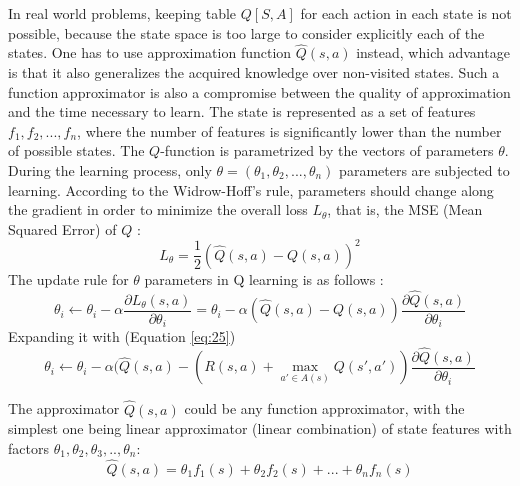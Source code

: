             
            In real world problems, keeping table $Q[S, A]$ for each action in each state is not possible,
            because the state space is too large to consider explicitly each of the states. One has to use
            approximation function  $\hat{Q}(s,a)$ instead, which advantage is that it also generalizes the acquired
            knowledge over non-visited states. Such a function approximator is also a compromise between
            the quality of approximation and the time necessary to learn.
            The state is represented as a set of features $f_1 , f_2 , ..., f_n$,  where the number of features is
            significantly lower than the number of possible states. The $Q$-function is parametrized by the
            vectors of parameters $\theta$. During the learning process, only $\theta = (\theta_1 , \theta_2 , ..., \theta_n )$ parameters are subjected to learning. According to the Widrow-Hoff's \cite{Sutton81towardsa} rule, parameters should change along
            the gradient in order to minimize the overall loss $L_\theta$, that is, the MSE (Mean Squared Error) of $Q$ :
            \begin{equation*}
                L_\theta=\frac{1}{2}(\hat{Q}(s,a)-Q(s,a))^2
            \end{equation*}
            The update rule for $\theta$ parameters in Q learning is as follows :
            \begin{equation*}
                \theta_i \gets \theta_i - \alpha \frac{\partial{L_\theta(s,a)}}{\partial{\theta_i}}=\theta_i - \alpha(\hat{Q}(s,a)-Q(s,a)) \frac{\partial{\hat{Q}(s,a)}}{\partial{\theta_i}}
            \end{equation*}
            Expanding it with (Equation \ref{eq:25})    
            \begin{equation*}
                \theta_i \gets \theta_i - \alpha(\hat{Q}(s,a)-(R(s,a)+ \max_{a' \in A(s)} Q(s',a')) \frac{\partial{\hat{Q}(s,a)}}{\partial{\theta_i}}
            \end{equation*}
            \par
            The approximator $\hat{Q}(s,a)$ could be any function approximator, with the simplest one being linear approximator (linear combination) of state features with factors $\theta_1,\theta_2,\theta_3,..,\theta_n$:
            \begin{equation*}
                \hat{Q}(s,a)=\theta_1 f_1(s)+ \theta_2 f_2(s) + ... + \theta_n f_n(s)
            \end{equation*}
            
